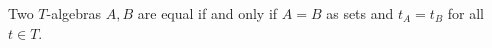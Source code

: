 Two $T$-algebras $A, B$ are equal if and only if $A = B$ as sets and $t_A = t_B$ for all $t \in T$.
